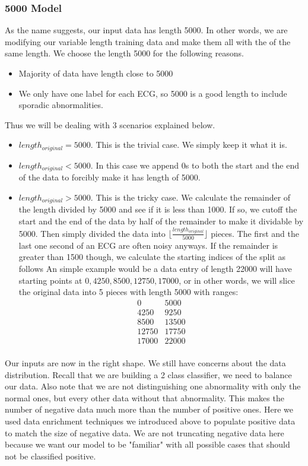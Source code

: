 \documentclass[runningheads]{llncs}
\begin{document}
\subsubsection{5000 Model}
As the name suggests, our input data has length 5000. In other words, we are modifying our variable length training data and make them all with the of the same length. We choose the length 5000 for the following reasons. 
\begin{itemize}
	\item Majority of data have length close to 5000
	\item We only have one label for each ECG, so 5000 is a good length to include sporadic abnormalities.
\end{itemize}
Thus we will be dealing with 3 scenarios explained below.
\begin{itemize}
	\item $length_{original} = 5000$. This is the trivial case. We simply keep it what it is.
	\item $length_{original} < 5000$. In this case we append 0s to both the start and the end of the data to forcibly make it has length of 5000.
	\item $length_{original} > 5000$. This is the tricky case. We calculate the remainder of the length divided by 5000 and see if it is less than 1000. 
	\subitem If so, we cutoff the start and the end of the data by half of the remainder to make it dividable by 5000. Then simply divided the data into $\lfloor \frac{length_{original}}{5000} \rfloor$ pieces. The first and the last one second of an ECG are often noisy anyways.
	\subitem If the remainder is greater than 1500 though, we calculate the starting indices of the split as follows
	An simple example would be a data entry of length 22000 will have starting points at $0, 4250, 8500, 12750, 17000$, or in other words, we will slice the original data into 5 pieces with length 5000 with ranges:
	$$
	\begin{matrix}
	0&5000 \\
	4250&9250 \\
	8500&13500 \\
	12750&17750 \\
	17000&22000 \\
	\end{matrix}
	$$
\end{itemize}
Our inputs are now in the right shape. We still have concerns about the data distribution. Recall that we are building a 2 class classifier, we need to balance our data. Also note that we are not distinguishing one abnormality with only the normal ones, but every other data without that abnormality. This makes the number of negative data much more than the number of positive ones. Here we used data enrichment techniques we introduced above to populate positive data to match the size of negative data. We are not truncating negative data here because we want our model to be "familiar" with all possible cases that should not be classified positive.
\end{document}
